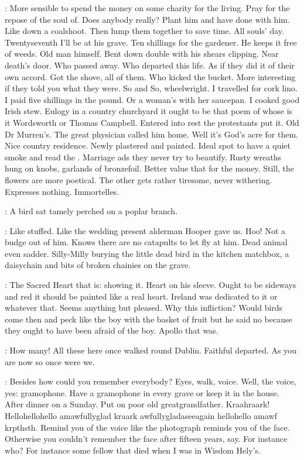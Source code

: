\BloomInt:
More sensible
to spend the money on some charity for the living.
Pray for the repose of the soul of.
Does anybody really?
Plant him and have done with him.
Like down a coalshoot.
Then lump them together to save time.
All souls' day.
Twentyseventh I'll be at his grave.
Ten shillings for the gardener.
He keeps it free of weeds.
Old man himself.
Bent down double with his shears clipping.
Near death's door.
Who passed away.
Who departed this life.
As if they did it of their own accord.
Got the shove, all of them.
Who kicked the bucket.
More interesting if they told you what they were.
So and So, wheelwright.
I travelled for cork lino.
I paid five shillings in the pound.
Or a woman's with her saucepan.
I cooked good Irish stew.
Eulogy in a country churchyard it ought to be
that poem of whose is it Wordsworth or Thomas Campbell.
Entered into rest the protestants put it.
Old Dr Murren's.
The great physician called him home.
Well it's God's acre for them.
Nice country residence.
Newly plastered and painted.
Ideal spot to have a quiet smoke and read the .
Marriage ads they never try to beautify.
Rusty wreaths hung on knobs, garlands of bronzefoil.
Better value that for the money.
Still, the flowers are more poetical.
The other gets rather tiresome, never withering.
Expresses nothing.
Immortelles.

:
A bird sat tamely perched on a poplar branch.

\BloomInt:
Like stuffed.
Like the wedding present alderman Hooper gave us.
Hoo!
Not a budge out of him.
Knows there are no catapults to let fly at him.
Dead animal even sadder.
Silly-Milly burying the little dead bird in the kitchen matchbox,
a daisychain and bits of broken chainies on the grave.

\BloomInt:
The Sacred Heart that is:
showing it.
Heart on his sleeve.
Ought to be sideways and red
it should be painted like a real heart.
Ireland was dedicated to it or whatever that.
Seems anything but pleased.
Why this infliction?
Would birds come then and peck
like the boy with the basket of fruit
but he said no
because they ought to have been afraid of the boy.
Apollo that was.

\BloomInt:
How many!
All these here once walked round Dublin.
Faithful departed.
As you are now so once were we.

\BloomInt:
Besides how could you remember everybody?
Eyes, walk, voice.
Well, the voice, yes:
gramophone.
Have a gramophone in every grave or keep it in the house.
After dinner on a Sunday.
Put on poor old greatgrandfather.
Kraahraark!
Hellohellohello amawfullyglad kraark awfullygladaseeagain hellohello amawf krpthsth.
Remind you of the voice
like the photograph reminds you of the face.
Otherwise you couldn't remember the face after fifteen years, say.
For instance who?
For instance some fellow that died
when I was in Wisdom Hely's.

